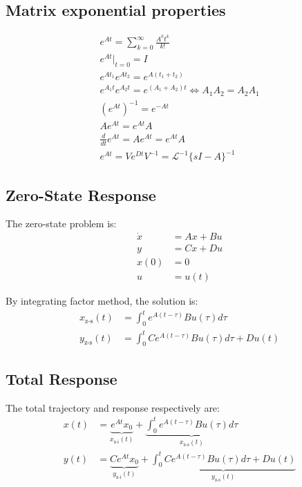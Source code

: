 \documentclass[letterpaper,12pt]{article}
\begin{document}
\subsection{Matrix exponential properties}
\begin{gather*}
    e^{At} = \sum_{k=0}^{\infty} \frac{A^kt^k}{k!} \\
    e^{At}|_{t=0} = I \\
    e^{At_1}e^{At_2} = e^{A(t_1 + t_2)} \\
    e^{A_1t}e^{A_2t} = e^{(A_1 + A_2)t} \iff A_1A_2 = A_2A_1 \\
    (e^{At})^{-1} = e^{-At} \\
    Ae^{At} = e^{At}A \\
    \frac{d}{dt}e^{At} = Ae^{At} = e^{At}A \\
    e^{At} = Ve^{Dt}V^{-1}  = \mathcal{L}^{-1}\{sI - A\}^{-1}
\end{gather*}

\subsection{Zero-State Response}
The zero-state problem is:
\begin{align*}
    \dot{x} &= Ax + Bu \\
    y &= Cx + Du \\
    x(0) &= 0 \\
    u &= u(t)
\end{align*}

By integrating factor method, the solution is:
\begin{align*}
    x_{\text{z-s}}(t) &= \int_{0}^{t} e^{A(t-\tau)}Bu(\tau) d\tau \\
    y_{\text{z-s}}(t) &= \int_{0}^{t} Ce^{A(t-\tau)}Bu(\tau) d\tau + Du(t)
\end{align*}

\subsection{Total Response}
The total trajectory and response respectively are:
\begin{align*}
    x(t) &= \underbrace{e^{At}x_0}_{x_{\text{z-i}}(t)} + \underbrace{\int_{0}^{t} e^{A(t-\tau)}Bu(\tau) d\tau}_{x_{\text{z-s}}(t)} \\
    y(t) &= \underbrace{Ce^{At}x_0}_{y_{\text{z-i}}(t)} + \underbrace{\int_{0}^{t} Ce^{A(t-\tau)}Bu(\tau) d\tau + Du(t)}_{y_{\text{z-s}}(t)}
\end{align*}
\end{document}
